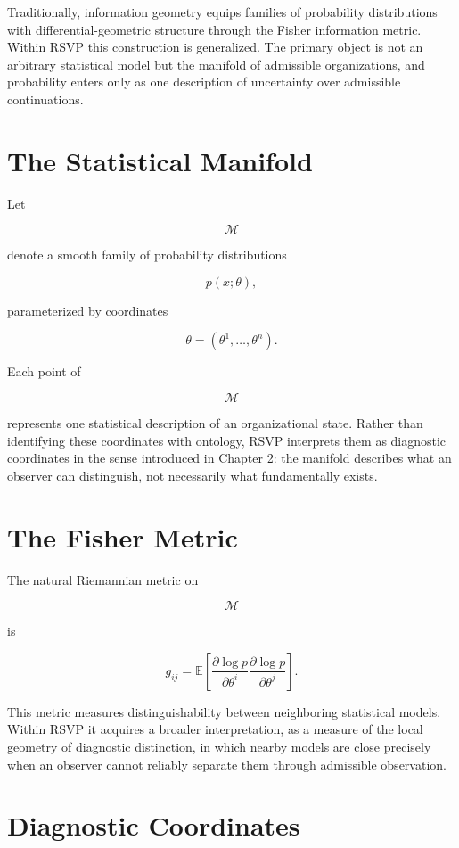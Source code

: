 \documentclass[11pt,oneside]{book}
\numberwithin{equation}{chapter}
\theoremstyle{definition}
\theoremstyle{plain}
\begin{document}
Traditionally, information geometry equips families of probability distributions with differential-geometric structure through the Fisher information metric. Within RSVP this construction is generalized. The primary object is not an arbitrary statistical model but the manifold of admissible organizations, and probability enters only as one description of uncertainty over admissible continuations.

\section{The Statistical Manifold}

Let

\[
\mathcal{M}
\]

denote a smooth family of probability distributions

\[
p(x;\theta),
\]

parameterized by coordinates

\[
\theta=(\theta^1,\ldots,\theta^n).
\]

Each point of

\[
\mathcal{M}
\]

represents one statistical description of an organizational state. Rather than identifying these coordinates with ontology, RSVP interprets them as diagnostic coordinates in the sense introduced in Chapter 2: the manifold describes what an observer can distinguish, not necessarily what fundamentally exists.

\section{The Fisher Metric}

The natural Riemannian metric on

\[
\mathcal M
\]

is

\[
g_{ij}
=
\mathbb E
\!\left[
\frac{\partial\log p}{\partial\theta^i}
\frac{\partial\log p}{\partial\theta^j}
\right].
\]

This metric measures distinguishability between neighboring statistical models. Within RSVP it acquires a broader interpretation, as a measure of the local geometry of diagnostic distinction, in which nearby models are close precisely when an observer cannot reliably separate them through admissible observation.

\section{Diagnostic Coordinates}
\end{document}
